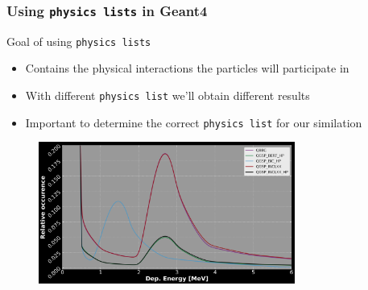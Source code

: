 \begin{frame}
\frametitle{Using \texttt{physics lists} in Geant4}

\begin{block}{Goal of using \texttt{physics lists}}
	\begin{itemize}
		\item Contains the physical interactions the particles will participate in
		\item With different \texttt{physics list} we'll obtain different results
		\item Important to determine the correct \texttt{physics list} for our similation
	\end{itemize}
\end{block}

\begin{figure}
	\includegraphics[width=0.75\textwidth]{images/energy_dist_full_concat_E100.png}
\end{figure}

\end{frame}